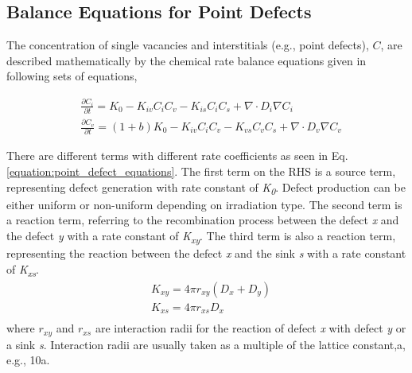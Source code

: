 \documentclass[utf8]{frontiersSCNS} %
\begin{document}

\subsection{Balance Equations for Point Defects}
 The concentration of single vacancies and interstitials (e.g., point defects), $C$, are described mathematically by the chemical rate balance equations given in following sets of equations,

\begin{equation}
  \begin{aligned}
    &\frac{\partial C_i}{\partial t} = K_0 - K_{iv}C_iC_v - K_{is}C_iC_s + \nabla\cdot D_i\nabla C_i\\
    &\frac{\partial C_v}{\partial t} = (1+b)K_0 - K_{iv}C_iC_v - K_{vs}C_vC_s + \nabla\cdot D_v\nabla C_v
  \end{aligned}
  \label{equation:point_defect_equations}
\end{equation}

    There are different terms with different rate coefficients as seen in Eq. \ref{equation:point_defect_equations}. The first term on the RHS is a source term, representing defect generation with rate constant of \textit{K\textsubscript{0}}. Defect production can be either uniform or non-uniform depending on irradiation type. The second term is a reaction term, referring to the recombination process between the defect \textit{x} and the defect \textit{y} with a rate constant of \textit{K\textsubscript{xy}}. The third term is also a reaction term, representing the reaction between the defect \textit{x} and the sink \textit{s} with a rate constant of \textit{K\textsubscript{xs}}.
    \begin{equation}
        \begin{aligned}
            &K_{xy} = 4\pi r_{xy}(D_x+D_y) \\
            &K_{xs} = 4\pi r_{xs}D_x \\
        \end{aligned}
        \label{equation:rate_constants}
    \end{equation}
    where $r_{xy}$ and $r_{xs}$ are interaction radii for the reaction of defect \textit{x} with defect \textit{y} or a sink \textit{s}. Interaction radii are usually taken as a multiple of the lattice constant,a, e.g., 10a. 
    
\end{document}
